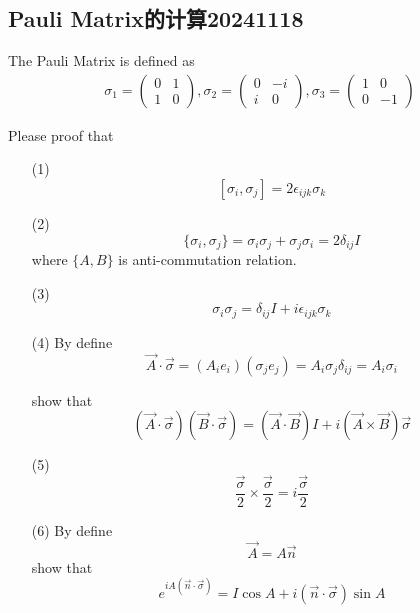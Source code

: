 \documentclass{article}
\newcommand{\pmtwo}[4]{
    \begin{pmatrix}
        #1&#2\\
        #3&#4
    \end{pmatrix}
    }
\begin{document}
\subsection{Pauli Matrix的计算20241118}

The Pauli Matrix is defined as 
\begin{align*}
    \sigma_1=\pmtwo{0}{1}{1}{0},\sigma_2=\pmtwo{0}{-i}{i}{0},\sigma_3=\pmtwo{1}{0}{0}{-1}
\end{align*}

Please proof that
\begin{enumerate}
    \item[(1)] \[[\sigma_i,\sigma_j]=2\epsilon_{ijk}\sigma_k\]
    \item[(2)] \[\{\sigma_i,\sigma_j\}=\sigma_i\sigma_j+\sigma_j\sigma_i=2\delta_{ij}I\] where $\{A,B\} $ is anti-commutation relation. 
    \item[(3)] \[\sigma_i\sigma_j=\delta_{ij}I+i\epsilon_{ijk}\sigma_k\]
    \item[(4)] By define 
    \[\vec{A}\cdot\vec{\sigma}=(A_ie_i)(\sigma_je_j)=A_i\sigma_j\delta_{ij}=A_i\sigma_i\]

    show that
    \[(\vec{A}\cdot\vec{\sigma})(\vec{B}\cdot\vec{\sigma})=(\vec{A}\cdot \vec{B})I+i(\vec{A}\times \vec{B})\vec{\sigma}\]
    \item[(5)] \[\frac{\vec{\sigma}}{2}\times \frac{\vec{\sigma}}{2}=i\frac{\vec{\sigma}}{2}\]
    \item[(6)] By define
    \[\vec{A}=A\vec{n}\]
    show that
    \[e^{iA(\vec{n}\cdot\vec{\sigma})}=I\cos{A}+i(\vec{n}\cdot\vec{\sigma})\sin{A}\]
\end{enumerate}
\end{document}
